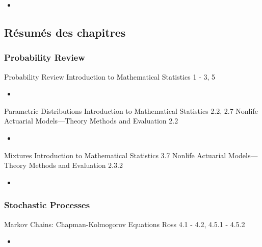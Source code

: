 \begin{YTB_vids}
\begin{itemize}
	\item	
\end{itemize}
\end{YTB_vids}

\subsection{Résumés des chapitres}

\subsubsection*{Probability Review}

\begin{CHPT_SUMM_AUTO_NUMB}[label = {L.-1}]{Probability Review}
Introduction to Mathematical Statistics 1 - 3, 5
	\begin{itemize}
		\item	
	\end{itemize}
\end{CHPT_SUMM_AUTO_NUMB}

\begin{CHPT_SUMM_AUTO_NUMB}[label = {L.-2}]{Parametric Distributions}
Introduction to Mathematical Statistics 2.2, 2.7
Nonlife Actuarial Models---Theory Methods and Evaluation 2.2
	\begin{itemize}
		\item	
	\end{itemize}
\end{CHPT_SUMM_AUTO_NUMB}

\begin{CHPT_SUMM_AUTO_NUMB}[label = {L.-3}]{Mixtures}
Introduction to Mathematical Statistics 3.7
Nonlife Actuarial Models---Theory Methods and Evaluation 2.3.2
	\begin{itemize}
		\item	
	\end{itemize}
\end{CHPT_SUMM_AUTO_NUMB}

\subsubsection*{Stochastic Processes}

\begin{CHPT_SUMM_AUTO_NUMB}[label = {L.-4}]{Markov Chains: Chapman-Kolmogorov Equations}
Ross 4.1 - 4.2, 4.5.1 - 4.5.2
	\begin{itemize}
		\item	
	\end{itemize}
\end{CHPT_SUMM_AUTO_NUMB}

